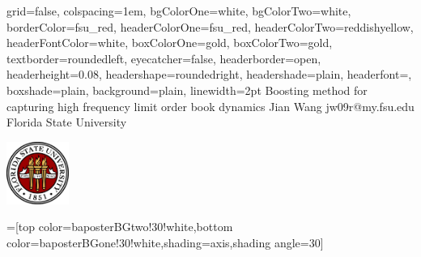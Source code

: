 \documentclass[paperwidth=36in,paperheight=24in,landscape,fontscale=0.4,final]{baposter}
\begin{document}
\begin{poster}{
  grid=false,
  colspacing=1em,
  bgColorOne=white,
  bgColorTwo=white,
  borderColor=fsu_red,
  headerColorOne=fsu_red,
  headerColorTwo=reddishyellow,
  headerFontColor=white,
  boxColorOne=gold,
  boxColorTwo=gold,
  textborder=roundedleft,
  eyecatcher=false,
  headerborder=open,
  headerheight=0.08\textheight,
  headershape=roundedright,
  headershade=plain,
  headerfont=\Large\textsf, %
  boxshade=plain,
  background=plain,
  linewidth=2pt
  }
  {} %
  {\sf %
  Boosting method for capturing high frequency limit order book dynamics}
  {\sf %
  Jian Wang\hspace{3em}
  jw09r@my.fsu.edu\hspace{3em}
  Florida State University
  }
  {{\begin{minipage}{16em}
    \hfill
    \includegraphics[height=5.5em]{fsu_logo.pdf}
  \end{minipage}}
  }

  =[top color=baposterBGtwo!30!white,bottom color=baposterBGone!30!white,shading=axis,shading angle=30]

     \newlength{\leftimgwidth}
     \setlength{\leftimgwidth}{0.78em+8.0em}

    \newcommand{\colouredcircle}[1]{%
      \tikz{\useasboundingbox (-0.2em,-0.32em) rectangle(0.2em,0.32em); \draw[draw=black,fill=baposterBGone!80!black!#1!white,line width=0.03em] (0,0) circle(0.18em);}}


\end{poster}
\end{document}
